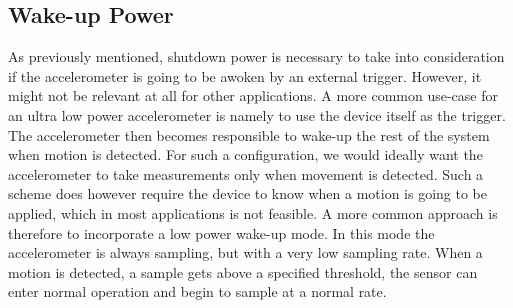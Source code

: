 
\subsection{Wake-up Power}

As previously mentioned, shutdown power is necessary to take into consideration if the accelerometer is going to be awoken by an external trigger. However, it might not be relevant at all for other applications. A more common use-case for an ultra low power accelerometer is namely to use the device itself as the trigger. The accelerometer then becomes responsible to wake-up the rest of the system when motion is detected. For such a configuration, we would ideally want the accelerometer to take measurements only when movement is detected. Such a scheme does however require the device to know when a motion is going to be applied, which in most applications is not feasible. A more common approach is therefore to incorporate a low power wake-up mode. In this mode the accelerometer is always sampling, but with a very low sampling rate. When a motion is detected, a sample gets above a specified threshold, the sensor can enter normal operation and begin to sample at a normal rate. 

